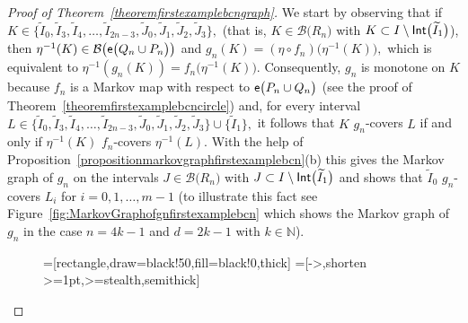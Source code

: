 \documentclass[a4paper, 11pt]{amsart}
\numberwithin{equation}{section}
\theoremstyle{customnumberedtheorem}
\theoremstyle{definitionwithbfnote}
\newcommand{\N}{\ensuremath{\mathbb{N}}}
\DeclareMathOperator{\Int}{\textsf{\upshape Int}}
\DeclareMathOperator{\eexp}{\textsf{\upshape e}}
\newcommand{\bigBIclass}[1]{\ensuremath{\bigl\llbracket #1\bigr\rrbracket}}
\newcommand{\bigemap}[1]{\ensuremath{\eexp\bigl(#1\bigr)}}
\def\calB{\mathcal{B}}
\newcommand{\bigSBI}[1]{\ensuremath{\calB\bigl(#1\bigr)}}
\begin{document}
\begin{proof}[Proof of Theorem~\ref{theoremfirstexamplebcngraph}]
We start by observing that if
$
  K \in \bigl\{\widetilde{I}_0, \widetilde{I}_3, \widetilde{I}_4, \dots,
          \widetilde{I}_{2n-3}, \widetilde{J}_0, \widetilde{J}_1, \widetilde{J}_2,
          \widetilde{J}_3\bigr\},
$
(that is, $K \in \bigSBI{R_n}$ with
 $K \subset I\setminus\Int\bigl(\widetilde{I}_1\bigr)$),
then $\eta^{-1}(K) \in \bigSBI{\bigemap{Q_n \cup P_n}}$
and $g_n(K) = (\eta \circ f_n) \bigl(\eta^{-1}(K)\bigr),$
which is equivalent to $\eta^{-1}(g_n(K)) = f_n\bigl(\eta^{-1}(K)\bigr).$
Consequently, $g_n$ is monotone on $K$ because
$f_n$ is a Markov map with respect to $\bigemap{P_n \cup Q_n}$
(see the proof of Theorem~\ref{theoremfirstexamplebcncircle})
and, for every interval
$
  L \in \bigl\{\widetilde{I}_0, \widetilde{I}_3, \widetilde{I}_4, \dots,
          \widetilde{I}_{2n-3}, \widetilde{J}_0, \widetilde{J}_1, \widetilde{J}_2,
          \widetilde{J}_3\bigr\} \cup \bigl\{\widetilde{I}_1\bigr\},
$
it follows that
$K$ $g_n$-covers $L$ if and only if $\eta^{-1}(K)$ $f_n$-covers $\eta^{-1}(L).$
With the help of
Proposition~\ref{propositionmarkovgraphfirstexamplebcn}(b)
this gives the Markov graph of $g_n$ on the intervals
$J \in \bigSBI{R_n}$ with $J \subset I\setminus\Int\bigl(\widetilde{I}_1\bigr)$
and shows that $\widetilde{I}_0$ $g_n$-covers $L_i$
for $i=0,1,\dots,m-1$
(to illustrate this fact see
Figure~\ref{fig:MarkovGraphofgnfirstexamplebcn} which shows the
Markov graph of $g_n$ in the case $n = 4k-1$ and $d = 2k-1$
with $k \in \N$).\vspace{-1ex}
\begin{figure}[ht]
\begin{center}\tiny
  =[rectangle,draw=black!50,fill=black!0,thick]
  =[->,shorten >=1pt,>=stealth,semithick]
\end{center}
\end{figure}
\end{proof}
\end{document}

